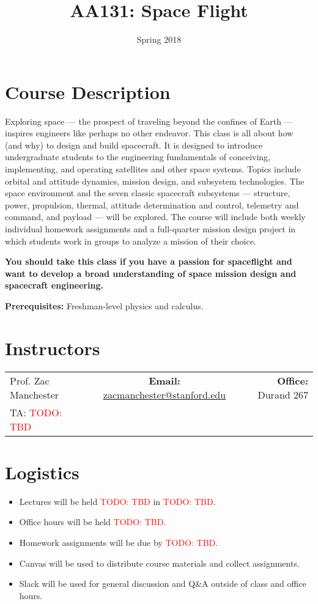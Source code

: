 \documentclass[11pt,letterpaper]{article}
\title{AA131: Space Flight}
\author{Spring 2018}
\date{}
\newcommand{\todo}[1]{\textcolor{red}{TODO: #1}}
\begin{document}
\maketitle

\section*{Course Description}

Exploring space --- the prospect of traveling beyond the confines of Earth --- inspires engineers like perhaps no other endeavor. This class is all about how (and why) to design and build spacecraft. It is designed to introduce undergraduate students to the engineering fundamentals of conceiving, implementing, and operating satellites and other space systems. Topics include orbital and attitude dynamics, mission design, and subsystem technologies. The space environment and the seven classic spacecraft subsystems --- structure, power, propulsion, thermal, attitude determination and control, telemetry and command, and payload --- will be explored. The course will include both weekly individual homework assignments and a full-quarter mission design project in which students work in groups to analyze a mission of their choice.

\medskip
\noindent
\textbf{You should take this class if you have a passion for spaceflight and want to develop a broad understanding of space mission design and spacecraft engineering.}

\medskip
\noindent
\textbf{Prerequisites:} Freshman-level physics and calculus.

\section*{Instructors}

\begin{center}
\begin{tabular}{l c r}
	Prof. Zac Manchester & \textbf{Email:} \href{mailto:zacmanchester@stanford.edu}{zacmanchester@stanford.edu} & \textbf{Office:} Durand 267 \\
	TA: \todo{TBD}
\end{tabular}
\end{center}

\section*{Logistics}

\begin{itemize}
	\item Lectures will be held \todo{TBD} in \todo{TBD}.
	\item Office hours will be held \todo{TBD}.
	\item Homework assignments will be due by \todo{TBD}.
	\item Canvas will be used to distribute course materials and collect assignments.
	\item Slack will be used for general discussion and Q\&A outside of class and office hours.
\end{itemize}
\end{document}
